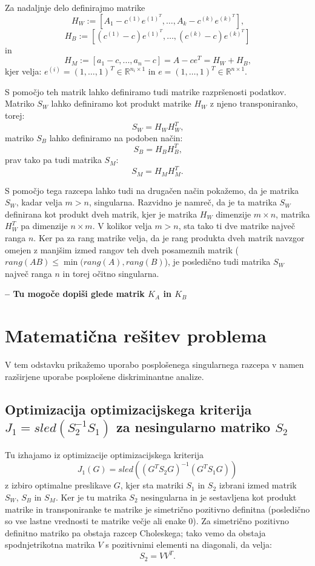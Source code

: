 \documentclass[mat1]{article}
\begin{document}
Za nadaljnje delo definirajmo matrike
$$H_W := [A_1 - c^{(1)}e^{(1)^T}, \ldots, A_k - c^{(k)}e^{(k)^T}] \text{,}$$
$$H_B := [(c^{(1)} - c)e^{(1)^T}, \ldots,(c^{(k)} - c) e^{(k)^T}]$$
in
$$H_M := [a_1 - c, ..., a_n - c] = A - ce^T = H_W + H_B\text{,}$$
kjer velja:
$e^{(i)} = (1,\ldots, 1) ^T \in \mathbb{R}^{ n_i \times 1 }$ in $e =  (1,\ldots, 1) ^T \in \mathbb{R}^{ n \times 1 }$.

S pomočjo teh matrik lahko definiramo tudi matrike razpršenosti podatkov. Matriko $S_W$ lahko definiramo kot produkt matrike $H_W$ z njeno transponiranko, torej:
$$S_W = H_W H_W^T \text{,}$$
matriko $S_B$ lahko definiramo na podoben način:
$$S_B = H_B H_B^T \text{,}$$
prav tako pa tudi matrika $S_M$:
$$S_M = H_M H_M^T \text{.}$$

S pomočjo tega razcepa lahko tudi na drugačen način pokažemo, da je matrika $S_W$, kadar velja $m>n$, singularna. Razvidno je namreč, da je ta matrika $S_W$ definirana kot produkt dveh matrik, kjer je matrika $H_W$ dimenzije $m \times n$, matrika $H_W^T$ pa dimenzije $n \times m$. V kolikor velja $m>n$, sta tako ti dve matrike največ ranga $n$.
Ker pa za rang matrike velja, da je rang produkta dveh matrik navzgor omejen z manjšim izmed rangov teh dveh posameznih matrik ($rang(AB) \leq \min(rang(A), rang(B)$), je posledično tudi matrika $S_W$ največ ranga $n$ in torej očitno singularna.

\textbf{-- Tu mogoče dopiši glede matrik $K_A$ in $K_B$}

\section{Matematična rešitev problema}
V tem odstavku prikažemo uporabo posplošenega singularnega razcepa v namen razširjene uporabe posplošene diskriminantne analize.
 
\subsection{Optimizacija optimizacijskega kriterija $J_1 = sled(S_2^{-1} S_1)$ za nesingularno matriko $S_2$}
Tu izhajamo iz optimizacije optimizacijskega kriterija 
$$J_1(G) = sled((G^T S_2 G)^{-1} (G^T S_1 G))$$
z izbiro optimalne preslikave $G$, kjer sta matriki $S_1$ in $S_2$ izbrani izmed matrik $S_W$, $S_B$ in $S_M$. Ker je tu matrika $S_2$ nesingularna in je sestavljena kot produkt matrike in transponiranke te matrike je simetrično pozitivno definitna (posledično so vse lastne vrednosti te matrike večje ali enake 0). Za simetrično pozitivno definitno matriko pa obstaja razcep Choleskega; tako vemo da obstaja spodnjetrikotna matrika $V$ s pozitivnimi elementi na diagonali, da velja:
$$ S_2 = V V^T \text{.}
$$
\end{document}

